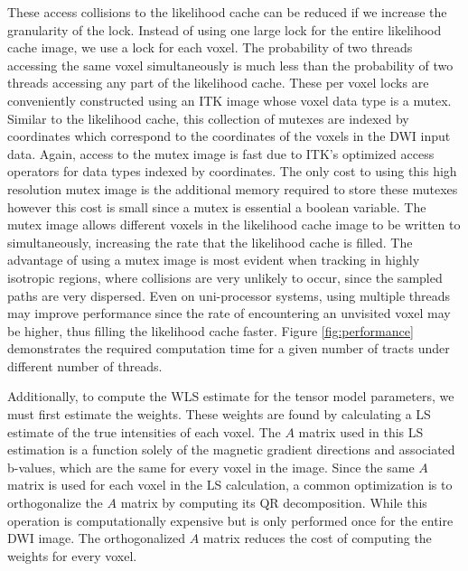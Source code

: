These access collisions to the likelihood cache can be reduced if we increase the granularity of the lock.  Instead of using one large lock for the entire likelihood cache image, we use a lock for each voxel.  The probability of two threads accessing the same voxel simultaneously is much less than the probability of two threads accessing any part of the likelihood cache.  These per voxel locks are conveniently constructed using an ITK image whose voxel data type is a mutex.  Similar to the likelihood cache, this collection of mutexes are indexed by coordinates which correspond to the coordinates of the voxels in the DWI input data.  Again, access to the mutex image is fast due to ITK's optimized access operators for data types indexed by coordinates.  The only cost to using this high resolution mutex image is the additional memory required to store these mutexes however this cost is small since a mutex is essential a boolean variable.  The mutex image allows different voxels in the likelihood cache image to be written to simultaneously, increasing the rate that the likelihood cache is filled.  The advantage of using a mutex image is most evident when tracking in highly isotropic regions,  where collisions are very unlikely to occur, since the sampled paths are very dispersed.  Even on uni-processor systems, using multiple threads may improve performance since the rate of encountering an unvisited voxel may be higher, thus filling the likelihood cache faster. Figure \ref{fig:performance} demonstrates the required computation time for a given number of tracts under different number of threads.

Additionally, to compute the WLS estimate for the tensor model parameters, we must first estimate the weights.  These weights are found by calculating a LS estimate of the true intensities of each voxel.  The $A$ matrix used in this LS estimation is a function solely of the magnetic gradient directions and associated b-values, which are the same for every voxel in the image.  Since the same $A$ matrix is used for each voxel in the LS calculation, a common optimization is to orthogonalize the $A$ matrix by computing its QR decomposition.  While this operation is computationally expensive but is only performed once for the entire DWI image.  The orthogonalized $A$ matrix reduces the cost of computing the weights for every voxel.

